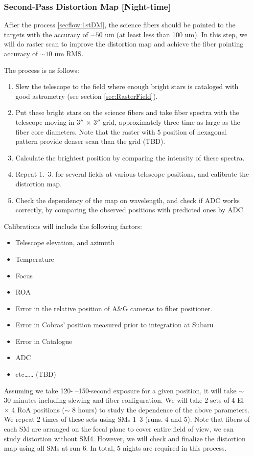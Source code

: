 \subsubsection{Second-Pass Distortion Map [Night-time]}\label{secflow:raster}

After the process \ref{secflow:1stDM}, the science fibers should be pointed to the targets with the accuracy of $\sim 50$ um (at least less than 100 um).
In this step, we will do raster scan to improve the distortion map and achieve the fiber pointing accuracy of $\sim 10$ um RMS.

The process is as follows:
\begin{enumerate}
\item Slew the telescope to the field where enough bright stars is cataloged with good astrometry (see section \ref{sec:RasterField}).
\item Put these bright stars on the science fibers and take fiber spectra with the telescope moving in 3$''$ $\times$ 3$''$ grid, approximately three time as large as the fiber core diameters.
Note that the raster with 5 position of hexagonal pattern provide denser scan than the grid (TBD).
\item Calculate the brightest position by comparing the intensity of these spectra.
\item Repeat 1.--3. for several fields at various telescope positions, and calibrate the distortion map.
\item Check the dependency of the map on wavelength, and check if ADC works correctly, by comparing the observed positions with predicted ones by ADC.
\end{enumerate}
Calibrations will include the following factors:
\begin{itemize}
\item Telescope elevation, and azimuth
\item Temperature
\item Focus
\item ROA
\item Error in the relative position of A\&G cameras to fiber positioner.
\item Error in Cobras' position measured prior to integration at Subaru
\item Error in Catalogue
\item ADC
\item etc…… (TBD)
\end{itemize}

Assuming we take 120- --150-second exposure for a given position, it will take $\sim$ 30 minutes including slewing and fiber configuration.
We will take 2 sets of 4 El $\times$ 4 RoA positions ($\sim$ 8 hours) to study the dependence of the above parameters.
We repeat 2 times of these sets using SMs 1--3 (runs. 4 and 5).
Note that fibers of each SM are arranged on the focal plane to cover entire field of view, we can study distortion without SM4.
However, we will check and finalize the distortion map using all SMs at run 6.
In total, 5 nights are required in this process.

